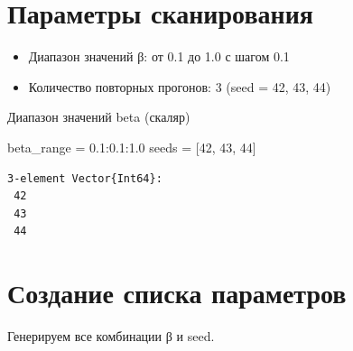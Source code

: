 \documentclass[
  12pt,
  a4paper,
  DIV=11,
  numbers=noendperiod]{scrreprt}
\newenvironment{Shaded}{\begin{snugshade}}{\end{snugshade}}
\newcommand{\FloatTok}[1]{\textcolor[rgb]{0.68,0.00,0.00}{#1}}
\newcommand{\NormalTok}[1]{\textcolor[rgb]{0.00,0.23,0.31}{#1}}
\newcommand{\OperatorTok}[1]{\textcolor[rgb]{0.37,0.37,0.37}{#1}}
\providecommand{\tightlist}{%
  \setlength{\itemsep}{0pt}\setlength{\parskip}{0pt}}\usepackage{longtable,booktabs,array}
\begin{document}
\section{Параметры
сканирования}\label{ux43fux430ux440ux430ux43cux435ux442ux440ux44b-ux441ux43aux430ux43dux438ux440ux43eux432ux430ux43dux438ux44f}

\begin{itemize}
\tightlist
\item
  Диапазон значений β: от 0.1 до 1.0 с шагом 0.1
\item
  Количество повторных прогонов: 3 (seed = 42, 43, 44)
\end{itemize}

Диапазон значений beta (скаляр)

\begin{Shaded}
\begin{Highlighting}[]
\NormalTok{beta\_range }\OperatorTok{=} \FloatTok{0.1}\OperatorTok{:}\FloatTok{0.1}\OperatorTok{:}\FloatTok{1.0}
\NormalTok{seeds }\OperatorTok{=}\NormalTok{ [}\FloatTok{42}\NormalTok{, }\FloatTok{43}\NormalTok{, }\FloatTok{44}\NormalTok{]}
\end{Highlighting}
\end{Shaded}

\begin{verbatim}
3-element Vector{Int64}:
 42
 43
 44
\end{verbatim}

\section{Создание списка
параметров}\label{ux441ux43eux437ux434ux430ux43dux438ux435-ux441ux43fux438ux441ux43aux430-ux43fux430ux440ux430ux43cux435ux442ux440ux43eux432}

Генерируем все комбинации β и seed.
\end{document}
